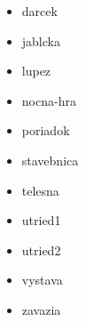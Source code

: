 



\begin{itemize}
\item darcek
\item jablcka
\item lupez
\item nocna-hra
\item poriadok
\item stavebnica
\item telesna
\item utried1
\item utried2
\item vystava
\item zavazia
\end{itemize}

